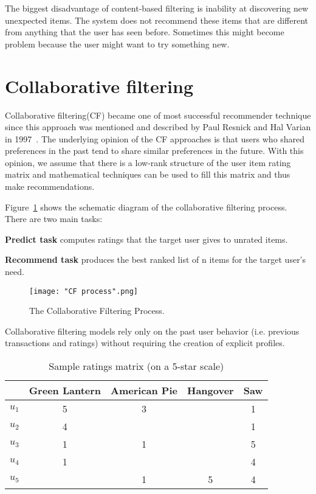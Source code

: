 \documentclass[oneside,13pt]{extreport}
\begin{document}
The biggest disadvantage of content-based filtering is inability at discovering new unexpected items. The system does not recommend these items that are different from anything that the user has seen before. Sometimes this might become problem
because the user might want to try something new.


\section{Collaborative filtering}
Collaborative filtering(CF) became one of most successful recommender technique since this approach was mentioned and described by Paul Resnick and Hal Varian in 1997~\cite{Resnick}. The underlying opinion of the CF approaches is that users who shared preferences in the past tend to share similar preferences in the future. With this opinion,
we assume that there is a low-rank structure of the user item rating
matrix and mathematical techniques can be used to fill this matrix
and thus make recommendations.
 
Figure~\ref{fig:CF process} shows the schematic diagram of the collaborative filtering process. There are two main tasks:
\begin{description}
    \item{\textbf{Predict task}} computes ratings that the target user gives to unrated items. 
    \item{\textbf{Recommend task}} produces the best ranked list of n items for the target user’s need.
\end{description}
\begin{figure}[h!]
    \centering
    \texttt{[image: "CF process".png]} 
    \caption{The Collaborative Filtering Process.}
    \label{fig:CF process}
\end{figure}
\clearpage    
Collaborative filtering models rely only on the past user behavior (i.e. previous transactions and ratings) without requiring the creation of explicit profiles. 

\begin{table}[h!]
    \small\centering
    \begin{tabular}{|c|c|c|c|c|}
        \hline
         & Green Lantern & American Pie & Hangover & Saw   \\
        \hline \hline
        $u_1$ & 5 & 3 &  & 1 \\
        \hline
        $u_2$ & 4 &  &  & 1 \\
        \hline
        $u_3$ & 1 & 1 &  & 5 \\
        \hline
        $u_4$ & 1 &  &  & 4 \\
        \hline
        $u_5$ &  & 1 & 5 & 4 \\
        \hline
    \end{tabular}
    \caption{Sample ratings matrix (on a 5-star scale)}
    \label{tab:rating_matrix-1}
\end{table}
\end{document}
